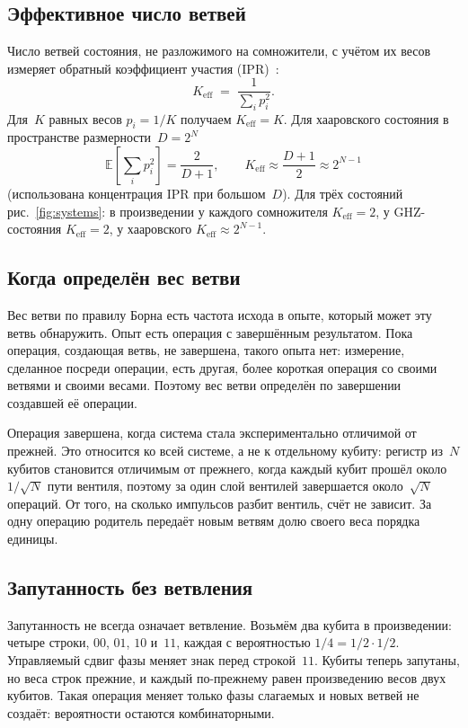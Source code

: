 \documentclass[11pt,a4paper]{article}
\newcommand{\Keff}{K_{\mathrm{eff}}}
\begin{document}
\subsection{Эффективное число ветвей}
\label{sec:keff}

Число ветвей состояния, не разложимого на сомножители, с учётом их весов измеряет обратный коэффициент участия (IPR)~\cite{thouless1974,grobe1994}:
\begin{equation}
\Keff \;=\; \frac{1}{\sum_i p_i^2}.
\end{equation}
Для~$K$ равных весов $p_i=1/K$ получаем $\Keff=K$. Для хааровского состояния в пространстве размерности~$D=2^N$
\begin{equation}
\mathbb E\!\left[\sum_i p_i^2\right]=\frac{2}{D+1},
\qquad
\Keff\approx\frac{D+1}{2}\approx2^{N-1}
\end{equation}
(использована концентрация IPR при большом~$D$). Для трёх состояний рис.~\ref{fig:systems}: в произведении у каждого сомножителя $\Keff=2$, у GHZ-состояния $\Keff=2$, у хааровского $\Keff\approx2^{N-1}$.

\subsection{Когда определён вес ветви}
\label{sec:weight}

Вес ветви по правилу Борна есть частота исхода в опыте, который может эту ветвь обнаружить. Опыт есть операция с завершённым результатом. Пока операция, создающая ветвь, не завершена, такого опыта нет: измерение, сделанное посреди операции, есть другая, более короткая операция со своими ветвями и своими весами. Поэтому вес ветви определён по завершении создавшей её операции.

Операция завершена, когда система стала экспериментально отличимой от прежней. Это относится ко всей системе, а не к отдельному кубиту: регистр из~$N$ кубитов становится отличимым от прежнего, когда каждый кубит прошёл около~$1/\sqrt N$ пути вентиля, поэтому за один слой вентилей завершается около~$\sqrt N$ операций. От того, на сколько импульсов разбит вентиль, счёт не зависит. За одну операцию родитель передаёт новым ветвям долю своего веса порядка единицы.

\subsection{Запутанность без ветвления}
\label{sec:phase}

Запутанность не всегда означает ветвление. Возьмём два кубита в произведении: четыре строки, $00$, $01$, $10$ и~$11$, каждая с вероятностью $1/4=1/2\cdot1/2$. Управляемый сдвиг фазы меняет знак перед строкой~$11$. Кубиты теперь запутаны, но веса строк прежние, и каждый по-прежнему равен произведению весов двух кубитов. Такая операция меняет только фазы слагаемых и новых ветвей не создаёт: вероятности остаются комбинаторными.
\end{document}

